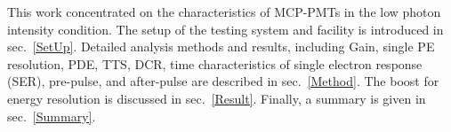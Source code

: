 This work concentrated on the characteristics of MCP-PMTs in the low photon intensity condition. The setup of the testing system and facility is introduced in sec.~\ref{SetUp}. Detailed analysis methods and results, including Gain, single PE resolution, PDE, TTS, DCR, time characteristics of single electron response (SER), pre-pulse, and after-pulse are described in sec.~\ref{Method}. The boost for energy resolution is discussed in sec.~\ref{Result}. Finally, a summary is given in sec.~\ref{Summary}.